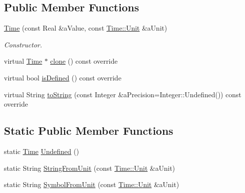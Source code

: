 \subsection*{Public Member Functions}
\begin{DoxyCompactItemize}
\item 
\hyperlink{classlibrary_1_1physics_1_1units_1_1_time_a60e2228b16ea9156a4c5ede4d7b141e5}{Time} (const Real \&a\+Value, const \hyperlink{classlibrary_1_1physics_1_1units_1_1_time_ab876a6a05c9a2f28905f2753bfd64109}{Time\+::\+Unit} \&a\+Unit)
\begin{DoxyCompactList}\small\item\em Constructor. \end{DoxyCompactList}\item 
virtual \hyperlink{classlibrary_1_1physics_1_1units_1_1_time}{Time} $\ast$ \hyperlink{classlibrary_1_1physics_1_1units_1_1_time_a8745ebee6707751e91137c3e87782b59}{clone} () const override
\item 
virtual bool \hyperlink{classlibrary_1_1physics_1_1units_1_1_time_ab62163386c3253277c5ba71782261cad}{is\+Defined} () const override
\item 
virtual String \hyperlink{classlibrary_1_1physics_1_1units_1_1_time_a6f56977493a45d334bb53bc4246888c4}{to\+String} (const Integer \&a\+Precision=Integer\+::\+Undefined()) const override
\end{DoxyCompactItemize}
\subsection*{Static Public Member Functions}
\begin{DoxyCompactItemize}
\item 
static \hyperlink{classlibrary_1_1physics_1_1units_1_1_time}{Time} \hyperlink{classlibrary_1_1physics_1_1units_1_1_time_a532c992968408dcb70f5ee94e672c595}{Undefined} ()
\item 
static String \hyperlink{classlibrary_1_1physics_1_1units_1_1_time_a413c7045742e568efc2e0e2b64eb6c86}{String\+From\+Unit} (const \hyperlink{classlibrary_1_1physics_1_1units_1_1_time_ab876a6a05c9a2f28905f2753bfd64109}{Time\+::\+Unit} \&a\+Unit)
\item 
static String \hyperlink{classlibrary_1_1physics_1_1units_1_1_time_aa48f07fb50e09cd22b9b6b7a83275f39}{Symbol\+From\+Unit} (const \hyperlink{classlibrary_1_1physics_1_1units_1_1_time_ab876a6a05c9a2f28905f2753bfd64109}{Time\+::\+Unit} \&a\+Unit)
\end{DoxyCompactItemize}


